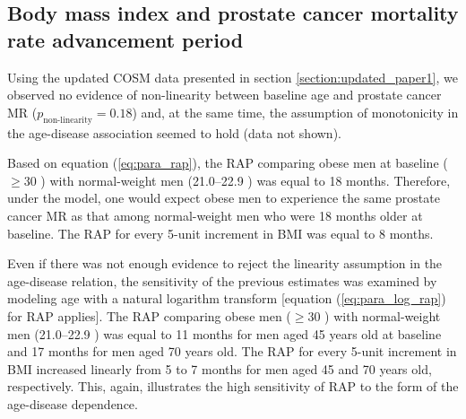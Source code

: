 \subsection{Body mass index and prostate cancer mortality rate advancement period}
\label{sec:example_rap_bmi}

Using the updated COSM data presented in section \ref{section:updated_paper1}, we observed no evidence of non-linearity between baseline age and prostate cancer MR ($p_{\textrm{non-linearity}}=0.18$) and, at the same time, the assumption of monotonicity in the age-disease association seemed to hold (data not shown). 

Based on equation (\ref{eq:para_rap}), the RAP comparing obese men at baseline ($\ge 30$ \kgmsq) with normal-weight men (21.0--22.9 \kgmsq) was equal to 18 months. Therefore, under the model, one would expect obese men to experience the same prostate cancer MR as that among normal-weight men who were 18 months older at baseline. The RAP for every 5-unit increment in BMI was equal to 8 months.

Even if there was not enough evidence to reject the linearity assumption in the age-disease relation, the sensitivity of the previous estimates was examined by modeling age with a natural logarithm transform [equation (\ref{eq:para_log_rap}) for RAP applies]. The RAP comparing obese men ($\ge 30$ \kgmsq) with normal-weight men (21.0--22.9 \kgmsq) was equal to 11 months for  men aged 45 years old at baseline and 17 months for  men aged 70 years old. The RAP for every 5-unit increment in BMI increased linearly from 5  to 7 months for men aged 45 and 70 years old, respectively. This, again, illustrates the high sensitivity of RAP to the form of the age-disease dependence.

















